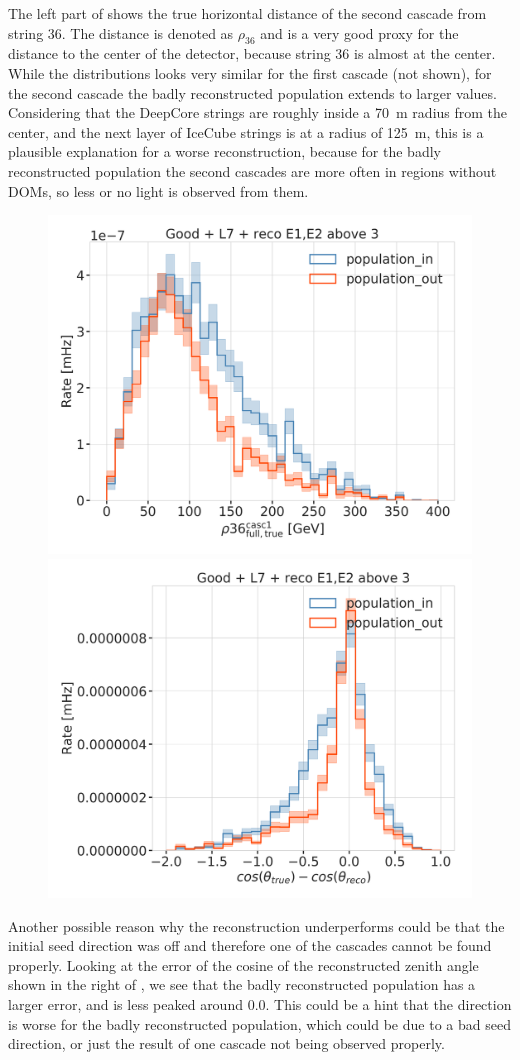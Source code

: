 The left part of  shows the true horizontal distance of the second cascade from string 36. The distance is denoted as $\rho_{36}$ and is a very good proxy for the distance to the center of the detector, because string 36 is almost at the center. While the distributions looks very similar for the first cascade (not shown), for the second cascade the badly reconstructed population extends to larger values. Considering that the DeepCore strings are roughly inside a \SI{70}{\meter} radius from the center, and the next layer of IceCube strings is at a radius of \SI{125}{\meter}, this is a plausible explanation for a worse reconstruction, because for the badly reconstructed population the second cascades are more often in regions without DOMs, so less or no light is observed from them.

\begin{figure}[h]
    \centering
    \includegraphics[width=0.49\linewidth]{figures/results/190607/second_population/casc1_rho36.png}
    \includegraphics[width=0.49\linewidth]{figures/results/190607/second_population/reco_true_cos_zenith_error_populations.png}
    \caption[]{}
\end{figure}

Another possible reason why the reconstruction underperforms could be that the initial seed direction was off and therefore one of the cascades cannot be found properly. Looking at the error of the cosine of the reconstructed zenith angle shown in the right of , we see that the badly reconstructed population has a larger error, and is less peaked around 0.0. This could be a hint that the direction is worse for the badly reconstructed population, which could be due to a bad seed direction, or just the result of one cascade not being observed properly.

